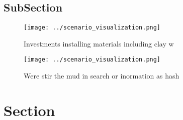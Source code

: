 \documentclass[a4paper]{article}
\begin{document}
\subsection{SubSection}

\begin{figure}
\centering
\texttt{[image: ../scenario\_visualization.png]}
\caption{Investments installing materials including clay w
}
\end{figure}
 
\begin{figure}
\centering
\texttt{[image: ../scenario\_visualization.png]}
\caption{Were stir the mud in search or inormation as hash
}
\end{figure}
 
\section{Section}
\end{document}
